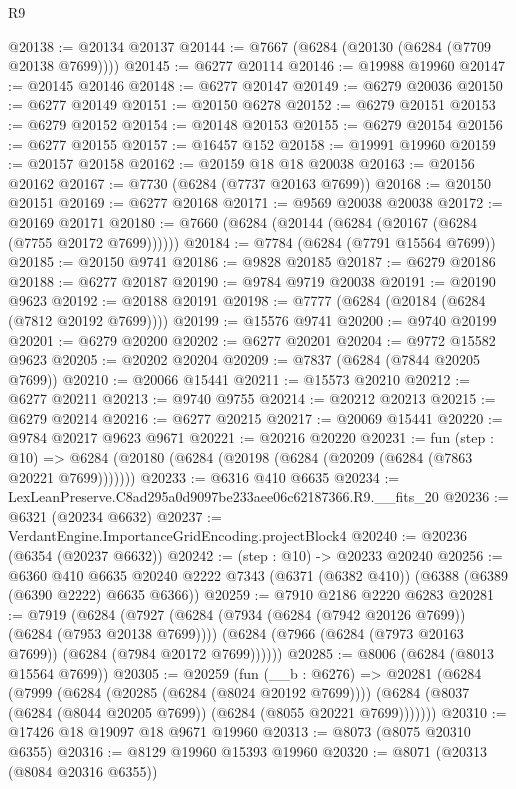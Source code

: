 \begin{lexlean}{R9}
\begin{coremodule}
@20138 := @20134 @20137
@20144 := @7667 (@6284 (@20130 (@6284 (@7709 @20138 @7699))))
@20145 := @6277 @20114
@20146 := @19988 @19960
@20147 := @20145 @20146
@20148 := @6277 @20147
@20149 := @6279 @20036
@20150 := @6277 @20149
@20151 := @20150 @6278
@20152 := @6279 @20151
@20153 := @6279 @20152
@20154 := @20148 @20153
@20155 := @6279 @20154
@20156 := @6277 @20155
@20157 := @16457 @152
@20158 := @19991 @19960
@20159 := @20157 @20158
@20162 := @20159 @18 @18 @20038
@20163 := @20156 @20162
@20167 := @7730 (@6284 (@7737 @20163 @7699))
@20168 := @20150 @20151
@20169 := @6277 @20168
@20171 := @9569 @20038 @20038
@20172 := @20169 @20171
@20180 := @7660 (@6284 (@20144 (@6284 (@20167 (@6284 (@7755 @20172 @7699))))))
@20184 := @7784 (@6284 (@7791 @15564 @7699))
@20185 := @20150 @9741
@20186 := @9828 @20185
@20187 := @6279 @20186
@20188 := @6277 @20187
@20190 := @9784 @9719 @20038
@20191 := @20190 @9623
@20192 := @20188 @20191
@20198 := @7777 (@6284 (@20184 (@6284 (@7812 @20192 @7699))))
@20199 := @15576 @9741
@20200 := @9740 @20199
@20201 := @6279 @20200
@20202 := @6277 @20201
@20204 := @9772 @15582 @9623
@20205 := @20202 @20204
@20209 := @7837 (@6284 (@7844 @20205 @7699))
@20210 := @20066 @15441
@20211 := @15573 @20210
@20212 := @6277 @20211
@20213 := @9740 @9755
@20214 := @20212 @20213
@20215 := @6279 @20214
@20216 := @6277 @20215
@20217 := @20069 @15441
@20220 := @9784 @20217 @9623 @9671
@20221 := @20216 @20220
@20231 := fun (step : @10) =>
  @6284 (@20180 (@6284 (@20198 (@6284 (@20209 (@6284 (@7863 @20221 @7699)))))))
@20233 := @6316 @410 @6635
@20234 := LexLeanPreserve.C8ad295a0d9097be233aee06c62187366.R9.__fits_20
@20236 := @6321 (@20234 @6632)
@20237 := VerdantEngine.ImportanceGridEncoding.projectBlock4
@20240 := @20236 (@6354 (@20237 @6632))
@20242 := (step : @10) -> @20233 @20240
@20256 := @6360
    @410
    @6635
    @20240
    @2222
    @7343
    (@6371 (@6382 @410))
    (@6388 (@6389 (@6390 @2222) @6635 @6366))
@20259 := @7910 @2186 @2220 @6283
@20281 := @7919
    (@6284
      (@7927
        (@6284 (@7934 (@6284 (@7942 @20126 @7699)) (@6284 (@7953 @20138 @7699))))
        (@6284 (@7966 (@6284 (@7973 @20163 @7699)) (@6284 (@7984 @20172 @7699))))))
@20285 := @8006 (@6284 (@8013 @15564 @7699))
@20305 := @20259
    (fun (__b : @6276) =>
    @20281
      (@6284
        (@7999
          (@6284 (@20285 (@6284 (@8024 @20192 @7699))))
          (@6284 (@8037 (@6284 (@8044 @20205 @7699)) (@6284 (@8055 @20221 @7699)))))))
@20310 := @17426 @18 @19097 @18 @9671 @19960
@20313 := @8073 (@8075 @20310 @6355)
@20316 := @8129 @19960 @15393 @19960
@20320 := @8071 (@20313 (@8084 @20316 @6355))

\end{coremodule}
\end{lexlean}
